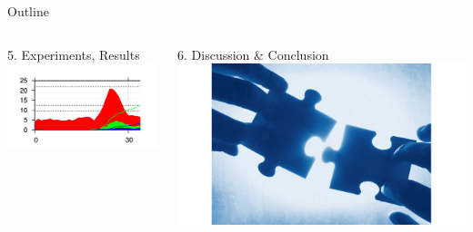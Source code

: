 \documentclass[a4paper]{beamer}
\begin{document}
\begin{frame}{Outline}
\begin{columns}[c]
		\begin{block}{5. Experiments, Results}
			\includegraphics[width= \textwidth]{results.png}
		\end{block}
																																          
		\begin{block}{6. Discussion \& Conclusion}
			\includegraphics[width= \textwidth]{conclusion.jpg}
		\end{block}
																																 
	\end{columns}
																    
														
																    
																    
\end{frame}


\end{document}
